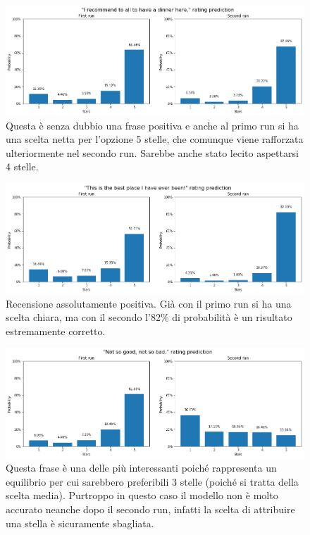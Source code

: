 \documentclass[12pt]{article}
\begin{document}
\begin{figure}[H]
\centering
\includegraphics[width=\textwidth]{images/sent2.png}
\caption{Questa è senza dubbio una frase positiva e anche al primo run si ha una scelta netta per l'opzione 5 stelle, che comunque viene rafforzata ulteriormente nel secondo run. Sarebbe anche stato lecito aspettarsi 4 stelle.}
\label{fig:random_sentences_2}
\end{figure}

\begin{figure}[H]
\centering
\includegraphics[width=\textwidth]{images/sent3.png}
\caption{Recensione assolutamente positiva. Già con il primo run si ha una scelta chiara, ma con il secondo l'82\% di probabilità è un risultato estremamente corretto.}
\label{fig:random_sentences_3}
\end{figure}

\begin{figure}[H]
\centering
\includegraphics[width=\textwidth]{images/sent4.png}
\caption{Questa frase è una delle più interessanti poiché rappresenta un equilibrio per cui sarebbero preferibili 3 stelle (poiché si tratta della scelta media). Purtroppo in questo caso il modello non è molto accurato neanche dopo il secondo run, infatti la scelta di attribuire una stella è sicuramente sbagliata.}
\label{fig:random_sentences_4}
\end{figure}
\end{document}
